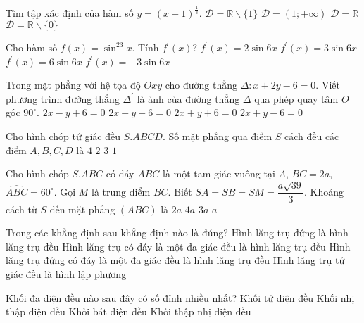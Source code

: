 \begin{ex}%
Tìm tập xác định của hàm số $y=(x-1)^{\frac{1}{3}}$.
\choice
{$\mathscr{D}=\mathbb{R}\backslash \{1\}$}
{\True $\mathscr{D}=(1; +\infty)$}
{$\mathscr{D}=\mathbb{R}$}
{$\mathscr{D}=\mathbb{R}\backslash \{0\}$}
\end{ex}

\begin{ex}%
Cho hàm số $f(x)={\sin}^23x$. Tính $f^\prime(x)$?
\choice
{$f^\prime(x)=2\sin 6x$}
{\True $f^\prime(x)=3\sin 6x$}
{$f^\prime(x)=6\sin 6x$}
{$f^\prime(x)=-3\sin 6x$}
\end{ex}

\begin{ex}%
Trong mặt phẳng với hệ tọa độ $Oxy$ cho đường thẳng $\Delta:x+2y-6=0$. Viết phương trình đường thẳng ${\Delta}^\prime$ là ảnh của đường thẳng $\Delta$ qua phép quay tâm $O$ góc $90^\circ$.
\choice
{\True $2x-y+6=0$}
{$2x-y-6=0$}
{$2x+y+6=0$}
{$2x+y-6=0$}
\end{ex}

\begin{ex}%
Cho hình chóp tứ giác đều $S.ABCD$. Số mặt phẳng qua điểm $S$ cách đều các điểm $A, B, C, D$ là
\choice
{$4$}
{\True $2$}
{$3$}
{$1$}
\end{ex}

\begin{ex}%
Cho hình chóp $S.ABC$ có đáy $ABC$ là một tam giác vuông tại $A$, $BC=2a$, $\widehat{ABC}=60^\circ$. Gọi $M$ là trung diểm $BC$. Biết $SA=SB=SM=\dfrac{a\sqrt{39}}{3}$. Khoảng cách từ $S$ đến mặt phẳng $(ABC)$ là
\choice
{\True $2a$}
{$4a$}
{$3a$}
{$a$}
\end{ex}

\begin{ex}%
Trong các khẳng định sau khẳng định nào là đúng?
\choice
{Hình lăng trụ đứng là hình lăng trụ đều}
{Hình lăng trụ có đáy là một đa giác đều là hình lăng trụ đều}
{\True Hình lăng trụ đứng có đáy là một đa giác đều là hình lăng trụ đều}
{Hình lăng trụ tứ giác đều là hình lập phương}
\end{ex}

\begin{ex}%
Khối đa diện đều nào sau đây có số đỉnh nhiều nhất?
\choice
{Khối tứ diện đều}
{Khối nhị thập diện đều}
{Khối bát diện đều}
{\True Khối thập nhị diện đều}
\end{ex}

